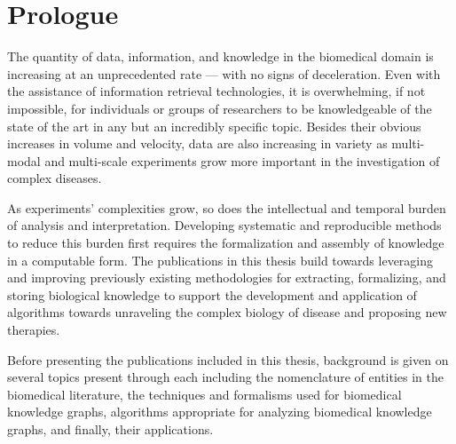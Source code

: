 \chapter{Prologue}
\label{ch:prologue}

The quantity of data, information, and knowledge in the biomedical domain is increasing at an unprecedented rate — with no signs of deceleration.
Even with the assistance of information retrieval technologies, it is overwhelming, if not impossible, for individuals or groups of researchers to be knowledgeable of the state of the art in any but an incredibly specific topic.
Besides their obvious increases in volume and velocity, data are also increasing in variety as multi-modal and multi-scale experiments grow more important in the investigation of complex diseases.

As experiments' complexities grow, so does the intellectual and temporal burden of analysis and interpretation.
Developing systematic and reproducible methods to reduce this burden first requires the formalization and assembly of knowledge in a computable form.
The publications in this thesis build towards leveraging and improving previously existing methodologies for extracting, formalizing, and storing biological knowledge to support the development and application of algorithms towards unraveling the complex biology of disease and proposing new therapies.

Before presenting the publications included in this thesis, background is given on several topics present through each including the nomenclature of entities in the biomedical literature, the techniques and formalisms used for biomedical knowledge graphs, algorithms appropriate for analyzing biomedical knowledge graphs, and finally, their applications.





